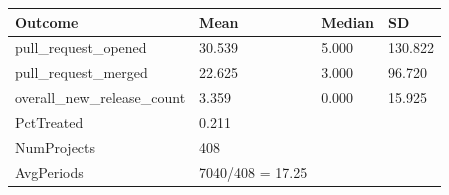 
\begin{tabular}{llll}
\toprule
Outcome & Mean & Median & SD\\
\midrule
pull\_request\_opened & 30.539 & 5.000 & 130.822\\
pull\_request\_merged & 22.625 & 3.000 & 96.720\\
overall\_new\_release\_count & 3.359 & 0.000 & 15.925\\
\midrule
PctTreated & 0.211 &  &  \\
NumProjects & 408 &  &  \\
AvgPeriods & 7040/408 = 17.25 &  &  \\
\bottomrule
\end{tabular}
